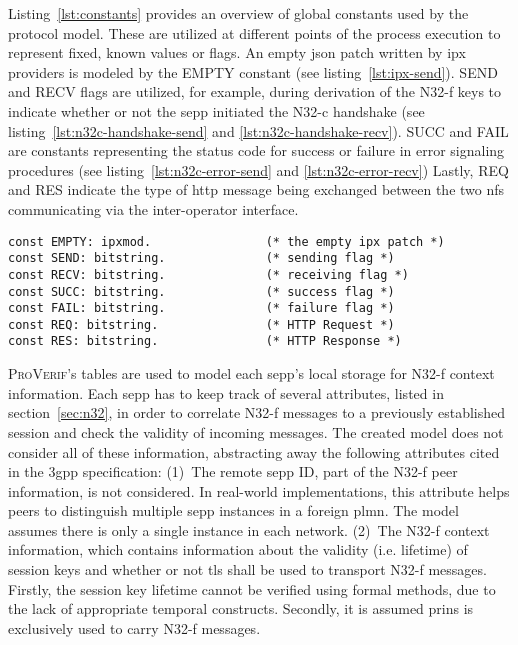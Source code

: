 Listing~\ref{lst:constants} provides an overview of global constants used by the protocol model.
These are utilized at different points of the process execution to represent fixed, known values or flags.
An empty \gls{json} patch written by \gls{ipx} providers is modeled by the {\sffamily EMPTY} constant (see listing~\ref{lst:ipx-send}).
{\sffamily SEND} and {\sffamily RECV} flags are utilized, for example, during derivation of the N32-f keys to indicate whether or not the \gls{sepp} initiated the N32-c handshake (see listing~\ref{lst:n32c-handshake-send} and \ref{lst:n32c-handshake-recv}).
{\sffamily SUCC} and {\sffamily FAIL} are constants representing the status code for success or failure in error signaling procedures (see listing~\ref{lst:n32c-error-send} and \ref{lst:n32c-error-recv})
Lastly, {\sffamily REQ} and {\sffamily RES} indicate the type of \gls{http} message being exchanged between the two \glspl{nf} communicating via the inter-operator interface.

\begin{lstlisting}[caption={Global constant declarations},label={lst:constants},firstnumber=34]
const EMPTY: ipxmod.                (* the empty ipx patch *)
const SEND: bitstring.              (* sending flag *)
const RECV: bitstring.              (* receiving flag *)
const SUCC: bitstring.              (* success flag *)
const FAIL: bitstring.              (* failure flag *)
const REQ: bitstring.               (* HTTP Request *)
const RES: bitstring.               (* HTTP Response *)
\end{lstlisting}

\textsc{ProVerif}'s tables are used to model each \gls{sepp}'s local storage for N32-f context information.
Each \gls{sepp} has to keep track of several attributes, listed in section~\ref{sec:n32}, in order to correlate N32-f messages to a previously established session and check the validity of incoming messages.
The created model does not consider all of these information, abstracting away the following attributes cited in the \gls{3gpp} specification:
(1)~The remote \gls{sepp} ID, part of the N32-f peer information, is not considered.
In real-world implementations, this attribute helps peers to distinguish multiple \gls{sepp} instances in a foreign \gls{plmn}.
The model assumes there is only a single instance in each network.
(2)~The N32-f context information, which contains information about the validity (i.e. lifetime) of session keys and whether or not \gls{tls} shall be used to transport N32-f messages.
Firstly, the session key lifetime cannot be verified using formal methods, due to the lack of appropriate temporal constructs.
Secondly, it is assumed \gls{prins} is exclusively used to carry N32-f messages.

